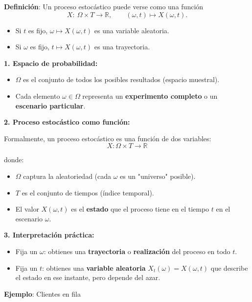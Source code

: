 \documentclass[12pt,a4paper]{article}
\newcommand{\definicion}[1]{%
\begin{definicionbox}
\textbf{Definición}: #1
\end{definicionbox}
}
\begin{document}
\definicion{Un proceso estocástico puede verse como una función
\begin{equation*}
X:\ \Omega \times T \longrightarrow \mathbb{R},\qquad (\omega,t)\mapsto X(\omega,t).
\end{equation*}
\begin{itemize}
    \item Si $t$ es fijo, $\omega \mapsto X(\omega,t)$ es una variable aleatoria.
    \item Si $\omega$ es fijo, $t \mapsto X(\omega,t)$ es una trayectoria.
\end{itemize}}

\textbf{1. Espacio de probabilidad:}
\begin{itemize}
    \item $\Omega$ es el conjunto de todos los posibles resultados (espacio muestral).
    \item Cada elemento $\omega \in \Omega$ representa un \textbf{experimento completo} o un \textbf{escenario particular}.
\end{itemize}

\textbf{2. Proceso estocástico como función:}

Formalmente, un proceso estocástico es una función de dos variables:
\begin{equation*}
X : \Omega \times T \to \mathbb{R}
\end{equation*}

donde:
\begin{itemize}
    \item $\Omega$ captura la aleatoriedad (cada $\omega$ es un "universo" posible).
    \item $T$ es el conjunto de tiempos (índice temporal).
    \item El valor $X(\omega, t)$ es el \textbf{estado} que el proceso tiene en el tiempo $t$ en el escenario $\omega$.
\end{itemize}

\textbf{3. Interpretación práctica:}
\begin{itemize}
    \item Fija un $\omega$: obtienes una \textbf{trayectoria} o \textbf{realización} del proceso en todo $t$.
    \item Fija un $t$: obtienes una \textbf{variable aleatoria} $X_t(\omega) = X(\omega, t)$ que describe el estado en ese instante, pero depende del azar.
\end{itemize}

\textbf{Ejemplo}: Clientes en fila
\begin{center}
\end{center}
\end{document}
